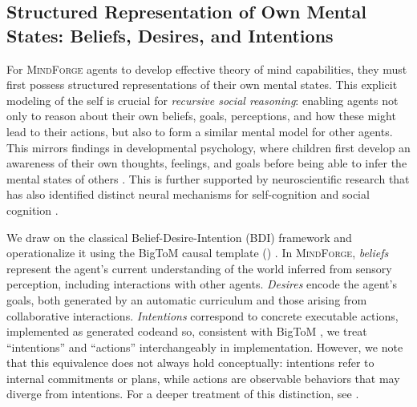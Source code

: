 \documentclass{article}
\newcommand{\collabvoyager}[0]{\mbox{\textsc{MindForge}}\xspace}
\begin{document}
\subsection{Structured Representation of Own Mental States: Beliefs, Desires, and Intentions}\label{ssec:world-model}
For \collabvoyager agents to develop effective theory of mind capabilities, they must first possess structured representations of their own mental states. 
This explicit modeling of the self is crucial for \textit{recursive social reasoning}: enabling agents not only to reason about their own beliefs, goals, perceptions, and how these might lead to their actions, but also to form a similar mental model for other agents. 
This mirrors findings in developmental psychology, where children first develop an awareness of their own thoughts, feelings, and goals before being able to infer the mental states of others \citep{Wellman1990-qh, Perner-book}. This is further supported by neuroscientific research that has also identified distinct neural mechanisms for self-cognition and social cognition \citep{Ochsner2004-jd, Saxe2003-zr}. 

We draw on the classical Belief-Desire-Intention (BDI) framework \citep{rao1995bdi} and operationalize it using the BigToM causal template () \citep{gandhi2024understanding}. In \collabvoyager, \textit{beliefs} represent the agent's current understanding of the world inferred from sensory perception, including interactions with other agents. \textit{Desires} encode the agent's goals, both generated by an automatic curriculum and those arising from collaborative interactions. \textit{Intentions} correspond to concrete executable actions, implemented as generated code\textemdash and so, consistent with BigToM \citep{gandhi2024understanding}, we treat ``intentions'' and ``actions'' interchangeably in implementation. However, we note that this equivalence does not always hold conceptually: intentions refer to internal commitments or plans, while actions are observable behaviors that may diverge from intentions. For a deeper treatment of this distinction, see \citep{hung2024discontent}.

 
\end{document}
